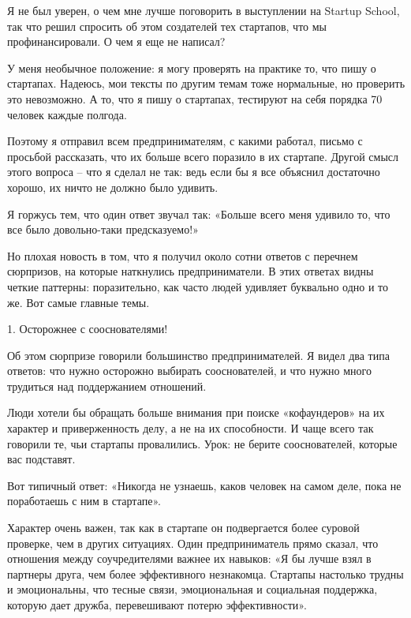 \documentclass[ebook,12pt,oneside,openany]{memoir}
\author{Пол Грэм} \date{}
\begin{document}
\maketitle

Я не был уверен, о чем мне лучше поговорить в выступлении на Startup
School, так что решил спросить об этом создателей тех стартапов, что
мы профинансировали. О чем я еще не написал?

У меня необычное положение: я могу проверять на практике то, что пишу
о стартапах. Надеюсь, мои тексты по другим темам тоже нормальные, но
проверить это невозможно. А то, что я пишу о стартапах, тестируют на
себя порядка 70 человек каждые полгода.

Поэтому я отправил всем предпринимателям, с какими работал, письмо с
просьбой рассказать, что их больше всего поразило в их стартапе.
Другой смысл этого вопроса – что я сделал не так: ведь если бы я все
объяснил достаточно хорошо, их ничто не должно было удивить.

Я горжусь тем, что один ответ звучал так: «Больше всего меня удивило
то, что все было довольно-таки предсказуемо!»

Но плохая новость в том, что я получил около сотни ответов с перечнем
сюрпризов, на которые наткнулись предприниматели. В этих ответах видны
четкие паттерны: поразительно, как часто людей удивляет буквально одно
и то же. Вот самые главные темы.

1. Осторожнее с сооснователями!

Об этом сюрпризе говорили большинство предпринимателей. Я видел два
типа ответов: что нужно осторожно выбирать сооснователей, и что нужно
много трудиться над поддержанием отношений.

Люди хотели бы обращать больше внимания при поиске «кофаундеров» на их
характер и приверженность делу, а не на их способности. И чаще всего
так говорили те, чьи стартапы провалились. Урок: не берите
сооснователей, которые вас подставят.

Вот типичный ответ: «Никогда не узнаешь, каков человек на самом деле,
пока не поработаешь с ним в стартапе».

Характер очень важен, так как в стартапе он подвергается более суровой
проверке, чем в других ситуациях. Один предприниматель прямо сказал,
что отношения между соучредителями важнее их навыков: «Я бы лучше взял
в партнеры друга, чем более эффективного незнакомца. Стартапы
настолько трудны и эмоциональны, что тесные связи, эмоциональная и
социальная поддержка, которую дает дружба, перевешивают потерю
эффективности».
\end{document}
